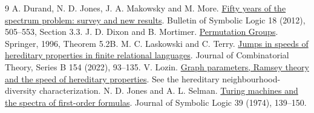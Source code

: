\documentclass[11pt]{article}
\begin{document}
\begin{thebibliography}{9}
 A. Durand, N. D. Jones, J. A. Makowsky and M. More. \href{https://doi.org/10.2178/bsl.1804020}{Fifty years of the spectrum problem: survey and new results}. Bulletin of Symbolic Logic 18 (2012), 505--553, Section 3.3.
 J. D. Dixon and B. Mortimer. \href{https://doi.org/10.1007/978-1-4612-0731-3}{Permutation Groups}. Springer, 1996, Theorem 5.2B.
 M. C. Laskowski and C. Terry. \href{https://arxiv.org/abs/1803.10575}{Jumps in speeds of hereditary properties in finite relational languages}. Journal of Combinatorial Theory, Series B 154 (2022), 93--135.
 V. Lozin. \href{https://arxiv.org/abs/1608.07727}{Graph parameters, Ramsey theory and the speed of hereditary properties}. See the hereditary neighbourhood-diversity characterization.
 N. D. Jones and A. L. Selman. \href{https://doi.org/10.2307/2272354}{Turing machines and the spectra of first-order formulas}. Journal of Symbolic Logic 39 (1974), 139--150.
\end{thebibliography}
\end{document}
